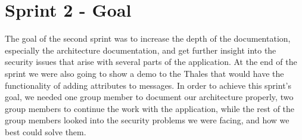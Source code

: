 \section{Sprint 2 - Goal}
The goal of the second sprint was to increase the depth of the documentation, especially the architecture documentation, and get further insight into the security issues that arise with several parts of the application. 
\newline
\newline
At the end of the sprint we were also going to show a demo to the Thales that would have the functionality of adding attributes to messages. 
\newline
\newline
In order to achieve this sprint’s goal, we needed one group member to document our architecture properly, two group members to continue the work with the application, while the rest of the group members looked into the security problems we were facing, and how we best could solve them.
